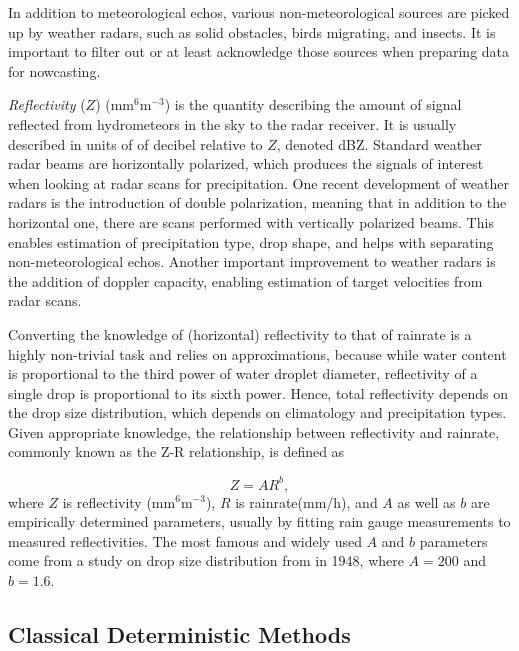 In addition to meteorological echos, various non-meteorological sources are picked up by weather radars, such as solid obstacles, birds migrating, and insects. It is important to filter out or at least acknowledge those sources when preparing data for nowcasting. 


\textit{Reflectivity} ($Z$) (mm$^{6}$m$^{-3}$) is the quantity describing the amount of signal reflected from hydrometeors in the sky to the radar receiver. It is usually described in units of of decibel relative to $Z$, denoted dBZ. Standard weather radar beams are horizontally polarized, which produces the signals of interest when looking at radar scans for precipitation. One recent development of weather radars is the introduction of double polarization, meaning that in addition to the horizontal one, there are scans performed with vertically polarized beams. This enables estimation of precipitation type, drop shape, and helps with separating non-meteorological echos. Another important improvement to weather radars is the addition of doppler capacity, enabling estimation of target velocities from radar scans. 


Converting the knowledge of (horizontal) reflectivity to that of rainrate is a highly non-trivial task and relies on approximations, because while water content is proportional to the third power of water droplet diameter, reflectivity of a single drop is proportional to its sixth power. Hence, total reflectivity depends on the drop size distribution, which depends on climatology and precipitation types. Given appropriate knowledge, the relationship between reflectivity and rainrate, commonly known as the Z-R relationship, is defined as  

\begin{equation}
\label{eq:z-r}
	Z = AR^b,
\end{equation}
where $Z$ is reflectivity (mm$^{6}$m$^{-3}$), $R$ is rainrate(mm/h), and $A$ as well as $b$ are empirically determined parameters, usually by fitting rain gauge measurements to measured reflectivities. The most famous and widely used $A$ and $b$ parameters come from a study on drop size distribution from \citet{marshall1948size} in 1948, where $A=200$ and $b=1.6$.


\subsection{Classical Deterministic Methods}
\label{section:classic_nowcast}


